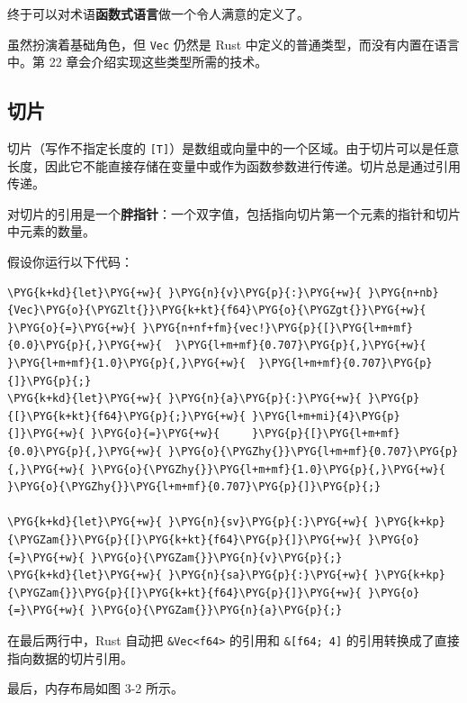终于可以对术语\textbf{函数式语言}做一个令人满意的定义了。

虽然扮演着基础角色，但 \texttt{Vec} 仍然是 Rust 中定义的普通类型，而没有内置在语言中。第 22 章会介绍实现这些类型所需的技术。

\subsection{切片}

切片（写作不指定长度的 \texttt{[T]}）是数组或向量中的一个区域。由于切片可以是任意长度，因此它不能直接存储在变量中或作为函数参数进行传递。切片总是通过引用传递。

对切片的引用是一个\textbf{胖指针}：一个双字值，包括指向切片第一个元素的指针和切片中元素的数量。

假设你运行以下代码：

\begin{Verbatim}[commandchars=\\\{\},breaklines=true,breakanywhere=true,fontsize=\codefont,xleftmargin=17bp]
\PYG{k+kd}{let}\PYG{+w}{ }\PYG{n}{v}\PYG{p}{:}\PYG{+w}{ }\PYG{n+nb}{Vec}\PYG{o}{\PYGZlt{}}\PYG{k+kt}{f64}\PYG{o}{\PYGZgt{}}\PYG{+w}{ }\PYG{o}{=}\PYG{+w}{ }\PYG{n+nf+fm}{vec!}\PYG{p}{[}\PYG{l+m+mf}{0.0}\PYG{p}{,}\PYG{+w}{  }\PYG{l+m+mf}{0.707}\PYG{p}{,}\PYG{+w}{  }\PYG{l+m+mf}{1.0}\PYG{p}{,}\PYG{+w}{  }\PYG{l+m+mf}{0.707}\PYG{p}{]}\PYG{p}{;}
\PYG{k+kd}{let}\PYG{+w}{ }\PYG{n}{a}\PYG{p}{:}\PYG{+w}{ }\PYG{p}{[}\PYG{k+kt}{f64}\PYG{p}{;}\PYG{+w}{ }\PYG{l+m+mi}{4}\PYG{p}{]}\PYG{+w}{ }\PYG{o}{=}\PYG{+w}{     }\PYG{p}{[}\PYG{l+m+mf}{0.0}\PYG{p}{,}\PYG{+w}{ }\PYG{o}{\PYGZhy{}}\PYG{l+m+mf}{0.707}\PYG{p}{,}\PYG{+w}{ }\PYG{o}{\PYGZhy{}}\PYG{l+m+mf}{1.0}\PYG{p}{,}\PYG{+w}{ }\PYG{o}{\PYGZhy{}}\PYG{l+m+mf}{0.707}\PYG{p}{]}\PYG{p}{;}

\PYG{k+kd}{let}\PYG{+w}{ }\PYG{n}{sv}\PYG{p}{:}\PYG{+w}{ }\PYG{k+kp}{\PYGZam{}}\PYG{p}{[}\PYG{k+kt}{f64}\PYG{p}{]}\PYG{+w}{ }\PYG{o}{=}\PYG{+w}{ }\PYG{o}{\PYGZam{}}\PYG{n}{v}\PYG{p}{;}
\PYG{k+kd}{let}\PYG{+w}{ }\PYG{n}{sa}\PYG{p}{:}\PYG{+w}{ }\PYG{k+kp}{\PYGZam{}}\PYG{p}{[}\PYG{k+kt}{f64}\PYG{p}{]}\PYG{+w}{ }\PYG{o}{=}\PYG{+w}{ }\PYG{o}{\PYGZam{}}\PYG{n}{a}\PYG{p}{;}
\end{Verbatim}

在最后两行中，Rust 自动把 \texttt{\&Vec<f64>} 的引用和 \texttt{\&[f64; 4]} 的引用转换成了直接指向数据的切片引用。

最后，内存布局如图 3-2 所示。


